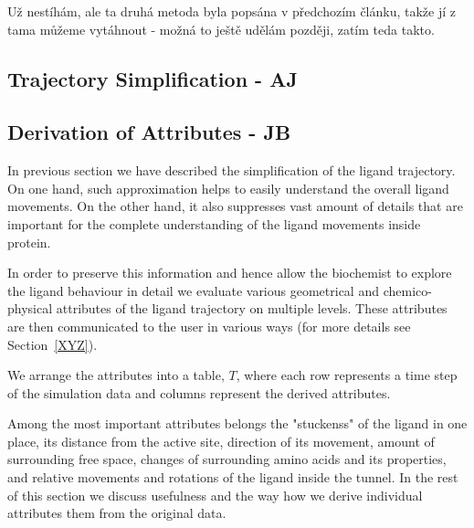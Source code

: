 \documentclass[twocolumn]{bmcart}%
\begin{document}
{\color{red} Už nestíhám, ale ta druhá metoda byla popsána v předchozím článku, takže jí z tama můžeme vytáhnout - možná to ještě udělám později, zatím teda takto.}


\subsection*{Trajectory Simplification - AJ}


\subsection*{Derivation of Attributes - JB}

In previous section we have described the simplification of the ligand trajectory. 
On one hand, such approximation helps to easily understand the overall ligand movements. 
On the other hand, it also suppresses vast amount of details that are important for the complete understanding of the ligand movements inside protein.

In order to preserve this information and hence allow the biochemist to explore the ligand behaviour in detail we evaluate various geometrical and chemico-physical attributes of the ligand trajectory on multiple levels. 
These attributes are then communicated to the user in various ways (for more details {\color{red}see Section~\ref{XYZ}}).

We arrange the attributes into a table, $T$, where each row represents a time step of the simulation data and columns represent the derived attributes. 

Among the most important attributes belongs the "stuckenss" of the ligand in one place, its distance from the active site, direction of its movement, amount of surrounding free space, changes of surrounding amino acids and its properties, and relative movements and rotations of the ligand inside the tunnel. 
In the rest of this section we discuss usefulness and the way how we derive individual attributes them from the original data.    
\end{document}
